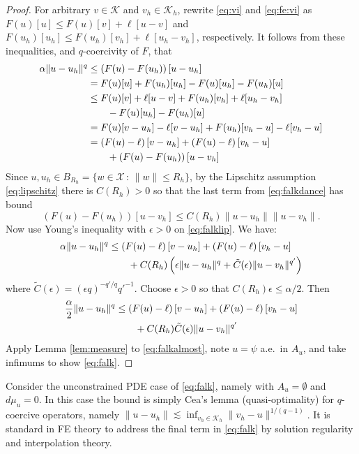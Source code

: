 \documentclass[]{interact}
\theoremstyle{plain}%
\theoremstyle{definition}
\theoremstyle{remark}
\newcommand{\eps}{\epsilon}
\newcommand{\cK}{\mathcal{K}}
\newcommand{\cX}{\mathcal{X}}
\begin{document}
\begin{proof}  For arbitrary $v\in\cK$ and $v_h\in\cK_h$, rewrite \eqref{eq:vi} and \eqref{eq:fe:vi} as $F(u)[u] \le F(u)[v] + \ell[u-v]$ and $F(u_h)[u_h] \le F(u_h)[v_h] + \ell[u_h-v_h]$, respectively.  It follows from these inequalities, and $q$-coercivity of $F$, that
\begin{align}
\alpha \|u-u_h\|^q &\le \left(F(u)-F(u_h)\right)[u-u_h] \label{eq:falkdance} \\
  &= F(u)[u] + F(u_h)[u_h] - F(u)[u_h] - F(u_h)[u] \notag \\
  &\le F(u)[v] + \ell[u-v] + F(u_h)[v_h] + \ell[u_h-v_h] \notag \\
  &\qquad - F(u)[u_h] - F(u_h)[u] \notag \\
  &= F(u)[v-u_h] - \ell[v-u_h] + F(u_h)[v_h-u] - \ell[v_h-u] \notag \\
  &= \left(F(u)-\ell\right)[v-u_h] + \left(F(u)-\ell\right)[v_h-u] \notag \\
  &\qquad + \left(F(u)-F(u_h)\right)[u-v_h] \notag
\end{align}
Since $u,u_h\in B_{R_h} = \{w\in\cX\,:\,\|w\|\le R_h\}$, by the Lipschitz assumption \eqref{eq:lipschitz} there is $C(R_h)>0$ so that the last term from \eqref{eq:falkdance} has bound
\begin{equation}
\left(F(u)-F(u_h)\right)[u-v_h] \le C(R_h) \|u-u_h\|\|u-v_h\|. \label{eq:falklip}
\end{equation}
Now use Young's inequality with $\eps>0$ \cite[Appendix B.2]{Evans2010} on \eqref{eq:falklip}.  We have:
\begin{align}
\alpha \|u-u_h\|^q &\le \left(F(u)-\ell\right)[v-u_h] + \left(F(u)-\ell\right)[v_h-u]  \label{eq:falkyoung} \\
  &\qquad + C(R_h) \left(\eps\|u-u_h\|^q + \tilde C(\eps) \|u-v_h\|^{q'}\right) \notag
\end{align}
where $\tilde C(\eps) = (\eps q)^{-q'/q} {q'}^{-1}$.  Choose $\eps>0$ so that $C(R_h) \eps \le \alpha/2$.  Then
\begin{align}
\frac{\alpha}{2} \|u-u_h\|^q &\le \left(F(u)-\ell\right)[v-u_h] + \left(F(u)-\ell\right)[v_h-u]  \label{eq:falkalmost} \\
  &\qquad + C(R_h) \tilde C(\eps) \|u-v_h\|^{q'} \notag
\end{align}
Apply Lemma \ref{lem:measure} to \eqref{eq:falkalmost}, note $u=\psi$ a.e.~in $A_u$, and take infimums to show \eqref{eq:falk}.\end{proof}

Consider the unconstrained PDE case of \eqref{eq:falk}, namely with $A_u=\emptyset$ and $d\mu_u=0$.  In this case the bound is simply Cea's lemma (quasi-optimality) for $q$-coercive operators, namely $\|u-u_h\| \lesssim \inf_{v_h\in\cK_h} \|v_h - u\|^{1/(q-1)}$.  It is standard in FE theory \cite{AinsworthOden2000,ElmanSilvesterWathen2014} to address the final term in \eqref{eq:falk} by solution regularity and interpolation theory.
\end{document}
